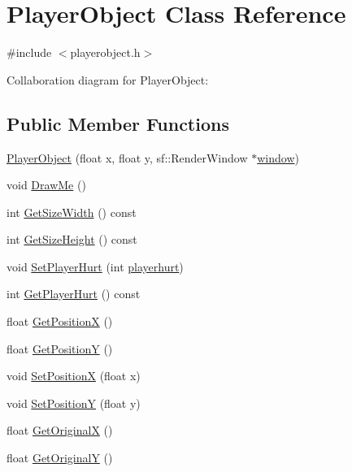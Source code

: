 \hypertarget{classPlayerObject}{}\section{Player\+Object Class Reference}
\label{classPlayerObject}


{\ttfamily \#include $<$playerobject.\+h$>$}



Collaboration diagram for Player\+Object\+:
\subsection*{Public Member Functions}
\begin{DoxyCompactItemize}
\item 
\hyperlink{classPlayerObject_a22c36bbb3a9f2f8121470aa78b294334}{Player\+Object} (float x, float y, sf\+::\+Render\+Window $\ast$\hyperlink{classPlayerObject_aed44bc97791e54cd2169f508699fa311}{window})
\item 
void \hyperlink{classPlayerObject_a510e91305c929bb86d7628b87b0d7e39}{Draw\+Me} ()
\item 
int \hyperlink{classPlayerObject_ae6a6f078e01cf54d91108ecfa4e2da02}{Get\+Size\+Width} () const 
\item 
int \hyperlink{classPlayerObject_a01be69eae2aad78c6e03ce6890179a22}{Get\+Size\+Height} () const 
\item 
void \hyperlink{classPlayerObject_a632afc4f75ec8df95d81c2ae81a08a70}{Set\+Player\+Hurt} (int \hyperlink{classPlayerObject_ae033dcf570f627c5b2a0286b882e8c21}{playerhurt})
\item 
int \hyperlink{classPlayerObject_a9cedbd637ab791f2ff2188fba2d7612a}{Get\+Player\+Hurt} () const 
\item 
float \hyperlink{classPlayerObject_aa84a7779304b680fa32b88b01ba95d02}{Get\+PositionX} ()
\item 
float \hyperlink{classPlayerObject_ad17b9ec44299f4dc9ca20064c883496b}{Get\+PositionY} ()
\item 
void \hyperlink{classPlayerObject_abe7e23cb831430c9926cb3b5206fff1f}{Set\+PositionX} (float x)
\item 
void \hyperlink{classPlayerObject_a19962eed7a6cfd28af75d9d5e15cb27a}{Set\+PositionY} (float y)
\item 
float \hyperlink{classPlayerObject_ac87a43be5d38f99829c9b02f6c042c6c}{Get\+OriginalX} ()
\item 
float \hyperlink{classPlayerObject_aa756cf94d6309698f2220e7ec59140f0}{Get\+OriginalY} ()

\end{DoxyCompactItemize}
